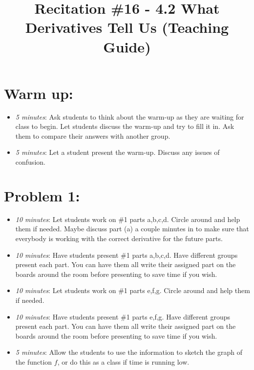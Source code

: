 \documentclass[handout,nooutcomes]{ximera}
\title{Recitation \#16 - 4.2 What Derivatives Tell Us (Teaching Guide)}
\begin{document}
\begin{abstract}		\end{abstract}
\maketitle


\section*{Warm up:} 
	
	\begin{itemize}
	
	\item  \emph{5 minutes}:  Ask students to think about the warm-up as they are waiting for class to begin.  Let students discuss the warm-up and try to fill it in.  Ask them to compare their answers with another group.
	
	\item  \emph{5 minutes}:   Let a student present the warm-up.  Discuss any issues of confusion.
	
	\end{itemize}


\section*{Problem 1:}

	\begin{itemize}
	
	\item  \emph{10 minutes}:  Let students work on \#1 parts a,b,c,d.  Circle around and help them if needed. Maybe discuss part (a) a couple minutes in to make sure that everybody is working with the correct derivative for the future parts.
	
	\item  \emph{10 minutes}:  Have students present \#1 parts a,b,c,d.  Have different groups present each part.  You can have them all write their assigned part on the boards around the room before presenting to save time if you wish.
	
	\item  \emph{10 minutes}:  Let students work on \#1 parts e,f,g.  Circle around and help them if needed.
	
	\item  \emph{10 minutes}:  Have students present \#1 parts e,f,g.  Have different groups present each part.  You can have them all write their assigned part on the boards around the room before presenting to save time if you wish.
	
	\item  \emph{5 minutes}:  Allow the students to use the information to sketch the graph of the function $f$, or do this as a class if time is running low.
	
	\end{itemize}
	
	




	
	
	

	
	

	
	
	

	
	
	
\end{document}
